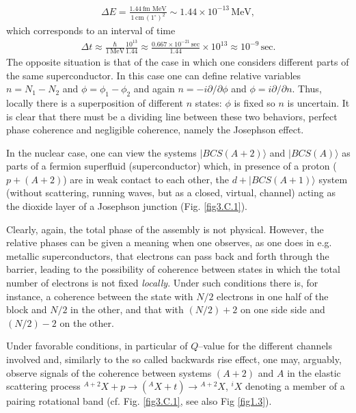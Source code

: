 \begin{align}
\Delta E=\frac{1.44\,\text{fm MeV}}{1\,\text{cm}\,(1^{\circ})^2}\sim 1.44 \times 10^{-13}\,\text{MeV},
\end{align}
which corresponds to an interval of time 
\begin{align}
\Delta t\approx \frac{\hbar}{1\,\text{MeV}}\frac{10^{13}}{1.44}\approx\frac{0.667\times 10^{-21}\,\text{sec}}{1.44}\times 10^{13}\approx 10^{-9}\,\text{sec}.
\end{align}
The opposite situation is that of the case in which one considers different parts of the same superconductor. In this case one can define relative variables $n=N_1-N_2$ and $\phi=\phi_1-\phi_2$ and again $n=-i\partial/\partial \phi$ and $\phi=i\partial/\partial n$. Thus, locally there is a superposition of different $n$ states: $\phi$ is fixed so $n$ is uncertain. It is clear that there must be a dividing line between these two behaviors, perfect phase coherence and negligible coherence, namely the Josephson effect.


In the nuclear case, one can view the systems $|BCS(A+2)\rangle$ and $|BCS(A)\rangle$ as parts of a fermion superfluid (superconductor) which, in presence of a proton ($p+(A+2)$) are in weak contact to each other, the $d+|BCS(A+1)\rangle$ system (without scattering, running waves, but as a closed, virtual, channel) acting as the dioxide layer of a Josephson junction (Fig. \ref{fig3.C.1}).


Clearly, again, the total phase of the assembly is not physical. However, the relative phases can be given a meaning when one observes, as one does in e.g. metallic superconductors, that electrons can pass back and forth through the barrier, leading to the possibility of coherence between states in which the total number of electrons is not fixed \emph{locally}. Under such conditions there is, for instance, a coherence between the state with $N/2$ electrons in one half of the block and $N/2$ in the other, and that with $(N/2)+2$ on one side side and $(N/2)-2$ on the other.


Under  favorable conditions, in particular of $Q$--value for the different channels involved and, similarly to the so called backwards rise effect, one may, arguably, observe signals of the coherence between systems $(A+2)$ and $A$ in the elastic scattering process $^{A+2}X+p\rightarrow ({^{A}X}+t)\rightarrow{^{A+2}X}$, $^{i}X$ denoting a member of a pairing rotational band (cf. Fig. \ref{fig3.C.1}, see also Fig \ref{fig1.3}). 




